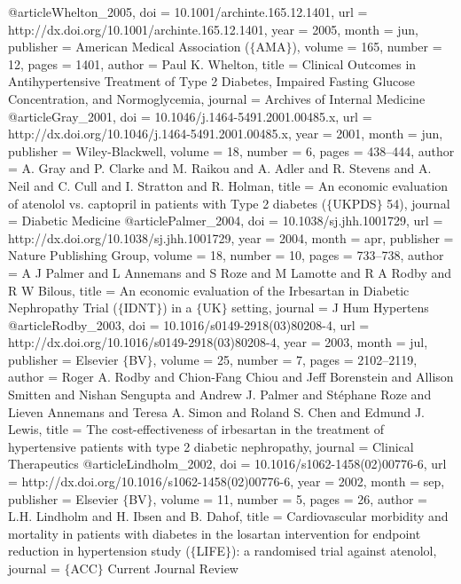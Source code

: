 @article{Whelton_2005,
	doi = {10.1001/archinte.165.12.1401},
	url = {http://dx.doi.org/10.1001/archinte.165.12.1401},
	year = 2005,
	month = {jun},
	publisher = {American Medical Association ($\lbrace$AMA$\rbrace$)},
	volume = {165},
	number = {12},
	pages = {1401},
	author = {Paul K. Whelton},
	title = {Clinical Outcomes in Antihypertensive Treatment of Type 2 Diabetes, Impaired Fasting Glucose Concentration, and Normoglycemia},
	journal = {Archives of Internal Medicine}
}
@article{Gray_2001,
	doi = {10.1046/j.1464-5491.2001.00485.x},
	url = {http://dx.doi.org/10.1046/j.1464-5491.2001.00485.x},
	year = 2001,
	month = {jun},
	publisher = {Wiley-Blackwell},
	volume = {18},
	number = {6},
	pages = {438--444},
	author = {A. Gray and P. Clarke and M. Raikou and A. Adler and R. Stevens and A. Neil and C. Cull and I. Stratton and R. Holman},
	title = {An economic evaluation of atenolol vs. captopril in patients with Type 2 diabetes ($\lbrace$UKPDS$\rbrace$ 54)},
	journal = {Diabetic Medicine}
}
@article{Palmer_2004,
	doi = {10.1038/sj.jhh.1001729},
	url = {http://dx.doi.org/10.1038/sj.jhh.1001729},
	year = 2004,
	month = {apr},
	publisher = {Nature Publishing Group},
	volume = {18},
	number = {10},
	pages = {733--738},
	author = {A J Palmer and L Annemans and S Roze and M Lamotte and R A Rodby and R W Bilous},
	title = {An economic evaluation of the Irbesartan in Diabetic Nephropathy Trial ($\lbrace$IDNT$\rbrace$) in a $\lbrace$UK$\rbrace$ setting},
	journal = {J Hum Hypertens}
}
@article{Rodby_2003,
	doi = {10.1016/s0149-2918(03)80208-4},
	url = {http://dx.doi.org/10.1016/s0149-2918(03)80208-4},
	year = 2003,
	month = {jul},
	publisher = {Elsevier $\lbrace$BV$\rbrace$},
	volume = {25},
	number = {7},
	pages = {2102--2119},
	author = {Roger A. Rodby and Chion-Fang Chiou and Jeff Borenstein and Allison Smitten and Nishan Sengupta and Andrew J. Palmer and St{\'{e}}phane Roze and Lieven Annemans and Teresa A. Simon and Roland S. Chen and Edmund J. Lewis},
	title = {The cost-effectiveness of irbesartan in the treatment of hypertensive patients with type 2 diabetic nephropathy},
	journal = {Clinical Therapeutics}
}
@article{Lindholm_2002,
	doi = {10.1016/s1062-1458(02)00776-6},
	url = {http://dx.doi.org/10.1016/s1062-1458(02)00776-6},
	year = 2002,
	month = {sep},
	publisher = {Elsevier $\lbrace$BV$\rbrace$},
	volume = {11},
	number = {5},
	pages = {26},
	author = {L.H. Lindholm and H. Ibsen and B. Dahof},
	title = {Cardiovascular morbidity and mortality in patients with diabetes in the losartan intervention for endpoint reduction in hypertension study ($\lbrace$LIFE$\rbrace$): a randomised trial against atenolol},
	journal = {$\lbrace$ACC$\rbrace$ Current Journal Review}
}
